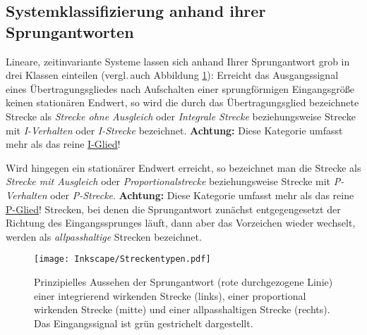 \subsection{Systemklassifizierung anhand ihrer Sprungantworten}
Lineare, zeitinvariante Systeme lassen sich anhand Ihrer Sprungantwort grob in drei Klassen einteilen (vergl.\,auch Abbildung \ref{fig:Streckentypen}):
Erreicht das Ausgangssignal eines Übertragungsgliedes nach Aufschalten einer sprungförmigen Eingangsgröße keinen stationären Endwert, so wird die durch das Übertragungsglied bezeichnete Strecke als \emph{Strecke ohne Ausgleich} oder \emph{Integrale Strecke} beziehungsweise Strecke mit \emph{I-Verhalten} oder \emph{I-Strecke} bezeichnet. \textbf{Achtung:} Diese Kategorie umfasst mehr als das reine \href{sec:i-glied}{I-Glied}!

Wird hingegen ein stationärer Endwert erreicht, so bezeichnet man die Strecke als \emph{Strecke mit Ausgleich} oder \emph{Proportionalstrecke} beziehungsweise Strecke mit \emph{P-Verhalten} oder \emph{P-Strecke}. \textbf{Achtung:} Diese Kategorie umfasst mehr als das reine \href{sec:p-glied}{P-Glied}!
Strecken, bei denen die Sprungantwort zunächst entgegengesetzt der Richtung des Eingangssprunges läuft, dann aber das Vorzeichen wieder wechselt, werden als \emph{allpasshaltige} Strecken bezeichnet.

\begin{figure}[htbp]
    \centering
    \texttt{[image: Inkscape/Streckentypen.pdf]}
    \caption{Prinzipielles Aussehen der Sprungantwort (rote durchgezogene Linie) einer integrierend wirkenden Strecke (links), einer proportional wirkenden Strecke (mitte) und einer allpasshaltigen Strecke (rechts). Das Eingangssignal ist grün gestrichelt dargestellt.}
    \label{fig:Streckentypen}
\end{figure}

